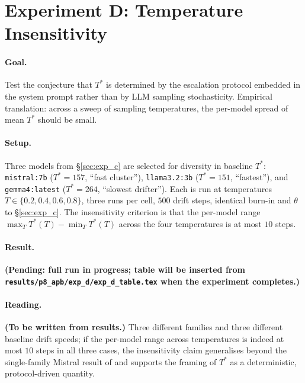 \documentclass[11pt]{article}
\newcommand{\Tstar}{T^*}
\begin{document}
\section{Experiment D: Temperature Insensitivity}
\label{sec:exp_d}

\paragraph{Goal.} Test the conjecture that $\Tstar$ is determined by
the escalation protocol embedded in the system prompt rather than by
LLM sampling stochasticity. Empirical translation: across a sweep
of sampling temperatures, the per-model spread of mean $\Tstar$
should be small.

\paragraph{Setup.} Three models from \S\ref{sec:exp_c} are selected
for diversity in baseline $\Tstar$: \texttt{mistral:7b} ($\Tstar = 157$,
``fast cluster''), \texttt{llama3.2:3b} ($\Tstar = 151$,
``fastest''), and \texttt{gemma4:latest} ($\Tstar = 264$,
``slowest drifter''). Each is run at temperatures
$T \in \{0.2, 0.4, 0.6, 0.8\}$, three runs per cell, $500$ drift
steps, identical burn-in and $\theta$ to \S\ref{sec:exp_c}. The
insensitivity criterion is that the per-model range
$\max_T \Tstar(T) - \min_T \Tstar(T)$ across the four temperatures is
at most $10$ steps.

\paragraph{Result.}
\textbf{(Pending: full run in progress; table will be inserted from
\texttt{results/p8\_apb/exp\_d/exp\_d\_table.tex} when the experiment
completes.)}



\paragraph{Reading.}
\textbf{(To be written from results.)} Three different families and
three different baseline drift speeds; if the per-model range across
temperatures is indeed at most $10$ steps in all three cases, the
insensitivity claim generalises beyond the single-family Mistral
result of \citep{fernandez2026applied} and supports the framing of
$\Tstar$ as a deterministic, protocol-driven quantity.

\end{document}
